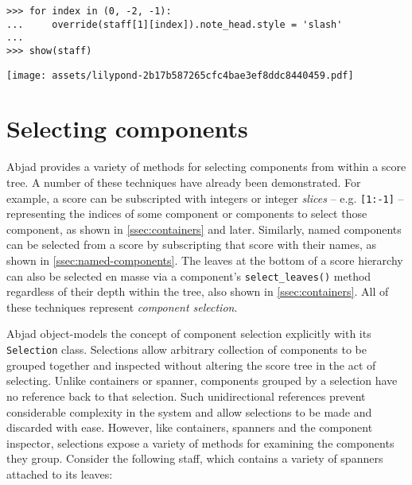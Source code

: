 \begin{comment}
<abjad>
for index in (0, -2, -1):
    override(staff[1][index]).note_head.style = 'slash'

show(staff)
</abjad>
\end{comment}

\begin{abjadbookoutput}
\begin{singlespacing}
\vspace{-0.5\baselineskip}
\begin{lstlisting}
>>> for index in (0, -2, -1):
...     override(staff[1][index]).note_head.style = 'slash'
...
>>> show(staff)
\end{lstlisting}
\noindent\texttt{[image: assets/lilypond-2b17b587265cfc4bae3ef8ddc8440459.pdf]}
\end{singlespacing}
\end{abjadbookoutput}


\section{Selecting components}
\label{sec:selecting-components}

Abjad provides a variety of methods for selecting components from within a
score tree. A number of these techniques have already been demonstrated. For
example, a score can be subscripted with integers or integer \emph{slices} --
e.g. \texttt{[1:-1]} -- representing the indices of some component or
components to select those component, as shown in \autoref{ssec:containers}
and later. Similarly, named components can be selected from a score by
subscripting that score with their names, as shown in
\autoref{ssec:named-components}. The leaves at the bottom of a score hierarchy
can also be selected en masse via a component's \texttt{select\_leaves()}
method regardless of their depth within the tree, also shown in
\autoref{ssec:containers}. All of these techniques represent \emph{component
selection}.

Abjad object-models the concept of component selection explicitly with its
\texttt{Selection} class. Selections allow arbitrary collection of components
to be grouped together and inspected without altering the score tree in the act
of selecting. Unlike containers or spanner, components grouped by a selection
have no reference back to that selection. Such unidirectional references
prevent considerable complexity in the system and allow selections to be made
and discarded with ease. However, like containers, spanners and the component
inspector, selections expose a variety of methods for examining the components
they group. Consider the following staff, which contains a variety of spanners
attached to its leaves:

